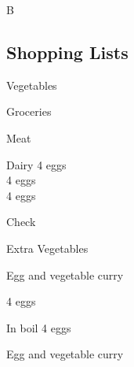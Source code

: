 		\begin{menu}{B}
    
    \subsection*{Shopping Lists}
      \begin{shoppinglist}{Vegetables}
      \end{shoppinglist}%
      \begin{shoppinglist}{Groceries}
      \end{shoppinglist}%
      \par %
      \begin{shoppinglist}{Meat}
      \end{shoppinglist}%
      \begin{shoppinglist}{Dairy}
      4  eggs \\ 
      4  eggs \\ 
      4  eggs \\ 
      \end{shoppinglist}%
      \par %
      \clearpage %
      \begin{shoppinglist}{Check}
      \end{shoppinglist}%
      \begin{shoppinglist}{Extra Vegetables}
      \end{shoppinglist}%
      \par %
    \clearpage
  
    \begin{recipe}{2}{Egg and vegetable curry}%
    
		\begin{ingredients}
		4  eggs  \\
	
		\end{ingredients}
	
    \begin{instructions}
    \item 
				In  boil
				4   eggs
    \end{instructions}
    \end{recipe}%
  
    \begin{recipe}{2}{Egg and vegetable curry}%
    

\end{recipe}
\end{menu}
